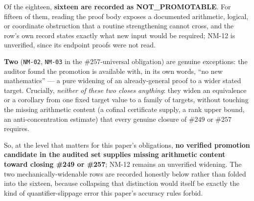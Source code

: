 Of the eighteen, \textbf{sixteen are recorded as NOT\_PROMOTABLE}. For
fifteen of them, reading the proof body exposes a documented arithmetic,
logical, or coordinate obstruction that a routine strengthening cannot cross,
and the row's own record states exactly what new input would be required;
NM-12 is unverified, since its endpoint proofs were not read.

\textbf{Two}
(\texttt{NM-02}, \texttt{NM-03} in the \(\#257\)-universal obligation) are
genuine exceptions: the auditor found the promotion is available with, in
its own words, ``no new mathematics'' — a pure widening of an already-general
proof to a wider stated target. Crucially, \emph{neither of these two closes
anything}: they widen an equivalence or a corollary from one fixed target
value to a family of targets, without touching the missing arithmetic
content (a cofinal certificate supply, a rank upper bound, an anti-concentration
estimate) that every genuine closure of \(\#249\) or \(\#257\) requires.

So, at the level that matters for this paper's obligations,
\textbf{no verified promotion candidate in the audited set supplies missing
arithmetic content toward closing \#249 or \#257}; NM-12 remains an unverified
widening. The two mechanically-widenable rows
are recorded honestly below rather than folded into the sixteen, because
collapsing that distinction would itself be exactly the kind of
quantifier-slippage error this paper's accuracy rules forbid.

